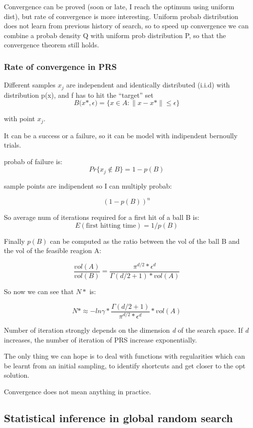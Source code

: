 \documentclass[11pt]{article}
\begin{document}
Convergence can be proved (soon or late, I reach the optimum using uniform dist), but rate of convergence is more interesting. Uniform probab distribution does not learn from previous history of search, so to speed up convergence we can combine a probab density Q with uniform prob distribution P, so that the convergence theorem still holds.

\subsubsection{Rate of convergence in PRS}
Different samples $ x_{j} $ are independent and identically distributed (i.i.d) with distribution p(x), and f has to hit the “target” set 
$$ 
B \big(x\ast , \epsilon \big) = \{ x \in A : \parallel x - x\ast \parallel \le \epsilon \}
$$

with point $ x_{j} $.

It can be a success or a failure, so it can be model with indipendent bernoully trials.

probab of failure is:
$$
Pr \{ x_j \notin B \} = 1-p(B)
$$

sample points are indipendent so I can multiply probab:

$$
(1-p(B))^n
$$

So average num of iterations required for a first hit of a ball B is:
$$
E(\text{first hitting time}) = 1 / p(B)
$$

Finally $ p(B) $ can be computed as the ratio between the vol of the ball B and the vol of the feasible reagion A:

$$ 
\frac{vol(A)}{vol(B)} = \frac{\pi^{d/2}*\epsilon^d}{\Gamma(d/2+1)*vol(A)}
$$

So now we can see that $ N\ast $ is:

$$
N\ast \approx -ln{\gamma} * \frac{\Gamma(d/2+1)}{\pi^{d/2}*\epsilon^{d}}*vol(A)
$$

Number of iteration strongly depends on the dimension \textit{d} of the search space. If \textit{d} increases, the number of iteration of PRS increase exponentially. 

The only thing we can hope is to deal with functions with regularities which can be learnt from an initial sampling, to identify shortcuts and get closer to the opt solution. 

Convergence does not mean anything in practice.

\subsection{Statistical inference in global random search}
\end{document}
